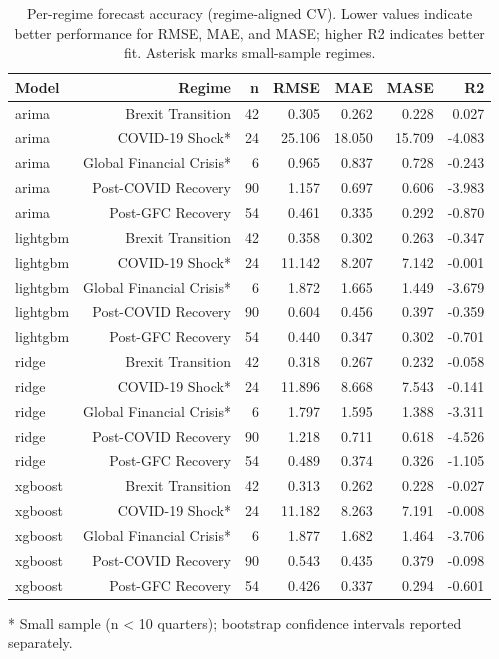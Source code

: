 \begin{table}
\caption{Per-regime forecast accuracy (regime-aligned CV). Lower values indicate better performance for RMSE, MAE, and MASE; higher R2 indicates better fit. Asterisk marks small-sample regimes.}
\begin{tabular}{lrrrrrr}
\toprule
Model & Regime & n & RMSE & MAE & MASE & R2 \\
\midrule
arima & Brexit Transition & 42 & 0.305 & 0.262 & 0.228 & 0.027 \\
arima & COVID-19 Shock* & 24 & 25.106 & 18.050 & 15.709 & -4.083 \\
arima & Global Financial Crisis* & 6 & 0.965 & 0.837 & 0.728 & -0.243 \\
arima & Post-COVID Recovery & 90 & 1.157 & 0.697 & 0.606 & -3.983 \\
arima & Post-GFC Recovery & 54 & 0.461 & 0.335 & 0.292 & -0.870 \\
lightgbm & Brexit Transition & 42 & 0.358 & 0.302 & 0.263 & -0.347 \\
lightgbm & COVID-19 Shock* & 24 & 11.142 & 8.207 & 7.142 & -0.001 \\
lightgbm & Global Financial Crisis* & 6 & 1.872 & 1.665 & 1.449 & -3.679 \\
lightgbm & Post-COVID Recovery & 90 & 0.604 & 0.456 & 0.397 & -0.359 \\
lightgbm & Post-GFC Recovery & 54 & 0.440 & 0.347 & 0.302 & -0.701 \\
ridge & Brexit Transition & 42 & 0.318 & 0.267 & 0.232 & -0.058 \\
ridge & COVID-19 Shock* & 24 & 11.896 & 8.668 & 7.543 & -0.141 \\
ridge & Global Financial Crisis* & 6 & 1.797 & 1.595 & 1.388 & -3.311 \\
ridge & Post-COVID Recovery & 90 & 1.218 & 0.711 & 0.618 & -4.526 \\
ridge & Post-GFC Recovery & 54 & 0.489 & 0.374 & 0.326 & -1.105 \\
xgboost & Brexit Transition & 42 & 0.313 & 0.262 & 0.228 & -0.027 \\
xgboost & COVID-19 Shock* & 24 & 11.182 & 8.263 & 7.191 & -0.008 \\
xgboost & Global Financial Crisis* & 6 & 1.877 & 1.682 & 1.464 & -3.706 \\
xgboost & Post-COVID Recovery & 90 & 0.543 & 0.435 & 0.379 & -0.098 \\
xgboost & Post-GFC Recovery & 54 & 0.426 & 0.337 & 0.294 & -0.601 \\
\bottomrule
\end{tabular}
\end{table}

* Small sample (n < 10 quarters); bootstrap confidence intervals reported separately.